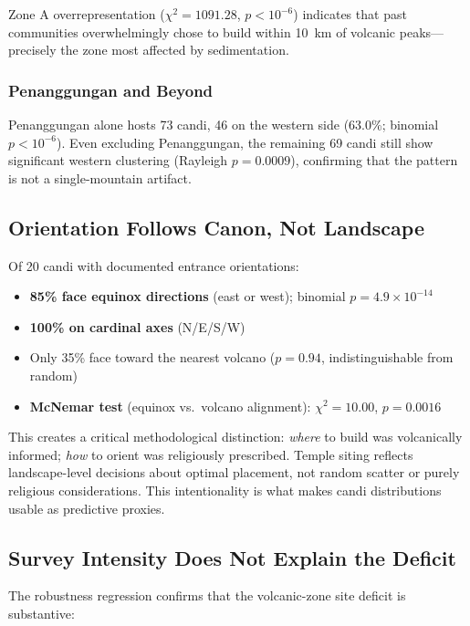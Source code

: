 \documentclass[12pt,a4paper]{article}
\begin{document}
Zone A overrepresentation ($\chi^2=1091.28$, $p<10^{-6}$) indicates that past communities overwhelmingly chose to build within 10~km of volcanic peaks---precisely the zone most affected by sedimentation.

\subsubsection{Penanggungan and Beyond}

Penanggungan alone hosts 73 candi, 46 on the western side (63.0\%; binomial $p<10^{-6}$). Even excluding Penanggungan, the remaining 69 candi still show significant western clustering (Rayleigh $p=0.0009$), confirming that the pattern is not a single-mountain artifact.

\subsection{Orientation Follows Canon, Not Landscape}

Of 20 candi with documented entrance orientations:
\begin{itemize}
    \item \textbf{85\% face equinox directions} (east or west); binomial $p=4.9\times10^{-14}$
    \item \textbf{100\% on cardinal axes} (N/E/S/W)
    \item Only 35\% face toward the nearest volcano ($p=0.94$, indistinguishable from random)
    \item \textbf{McNemar test} (equinox vs.\ volcano alignment): $\chi^2=10.00$, $p=0.0016$
\end{itemize}

This creates a critical methodological distinction: \emph{where} to build was volcanically informed; \emph{how} to orient was religiously prescribed. Temple siting reflects landscape-level decisions about optimal placement, not random scatter or purely religious considerations. This intentionality is what makes candi distributions usable as predictive proxies.

\subsection{Survey Intensity Does Not Explain the Deficit}
\label{sec:adv3results}

The robustness regression confirms that the volcanic-zone site deficit is substantive:
\end{document}
